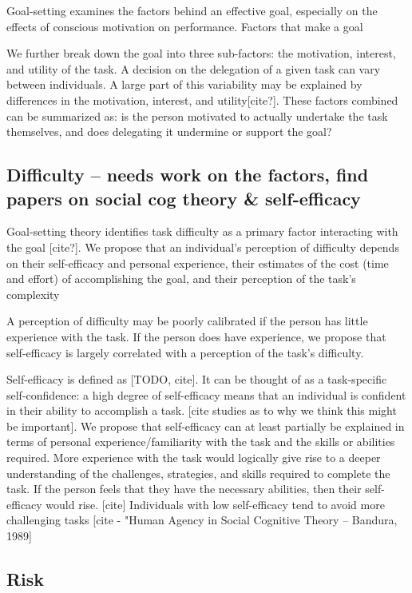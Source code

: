\documentclass[letterpaper]{article} %
\begin{document}
Goal-setting examines the factors behind an effective goal, especially on the effects of conscious motivation on performance. Factors that make a goal 

We further break down the goal into three sub-factors: the motivation, interest, and utility of the task.
A decision on the delegation of a given task can vary between individuals. A large part of this variability may be explained by differences in the motivation, interest, and utility[cite?]. These factors combined can be summarized as: is the person motivated to actually undertake the task themselves, and does delegating it undermine or support the goal?

\subsection{Difficulty -- needs work on the factors, find papers on social cog theory \& self-efficacy}
Goal-setting theory identifies task difficulty as a primary factor interacting with the goal [cite?]. We propose that an individual's perception of difficulty depends on their self-efficacy and personal experience, their estimates of the cost (time and effort) of accomplishing the goal, and their perception of the task's complexity

A perception of difficulty may be poorly calibrated if the person has little experience with the task. If the person does have experience, we propose that self-efficacy is largely correlated with a perception of the task's difficulty. 

Self-efficacy is defined as [TODO, cite]. It can be thought of as a task-specific self-confidence: a high degree of self-efficacy means that an individual is confident in their ability to accomplish a task. [cite studies as to why we think this might be important]. We propose that self-efficacy can at least partially be explained in terms of personal experience/familiarity with the task and the skills or abilities required. More experience with the task would logically give rise to a deeper understanding of the challenges, strategies, and skills required to complete the task. If the person feels that they have the necessary abilities, then their self-efficacy would rise. [cite] Individuals with low self-efficacy tend to avoid more challenging tasks [cite - "Human Agency in Social Cognitive Theory -- Bandura, 1989]

\subsection{Risk}
\end{document}
